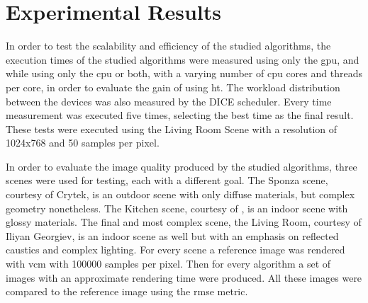 \chapter{Experimental Results}

In order to test the scalability and efficiency of the studied algorithms, the execution times of the studied algorithms were measured using only the \gls{gpu}, and while using only the \gls{cpu} or both, with a varying number of \gls{cpu} cores and threads per core, in order to evaluate the gain of using \gls{ht}. The workload distribution between the devices was also measured by the DICE scheduler. Every time measurement was executed five times, selecting the best time as the final result. These tests were executed using the Living Room Scene with a resolution of 1024x768 and 50 samples per pixel.

In order to evaluate the image quality produced by the studied algorithms, three scenes were used for testing, each with a different goal. The Sponza scene, courtesy of Crytek, is an outdoor scene with only diffuse materials, but complex geometry nonetheless. The Kitchen scene, courtesy of , is an indoor scene with glossy materials. The final and most complex scene, the Living Room, courtesy of Iliyan Georgiev, is an indoor scene as well but with an emphasis on reflected caustics and complex lighting. For every scene a reference image was rendered with \gls{vcm} with 100000 samples per pixel. Then for every algorithm a set of images with an approximate rendering time were produced. All these images were compared to the reference image using the \gls{rmse} metric.

